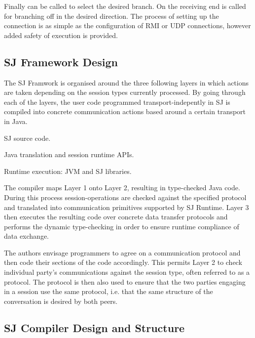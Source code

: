 Finally  can be called to select the desired branch. On the receiving end 
 is called for branching off in the desired direction. The process of setting up the connection is as simple as the configuration of RMI or UDP connections, however added safety of execution is provided.



\subsection{SJ Framework Design}
\label{subsec:sjdesign}

The SJ Framwork is organised around the three following layers in which actions are taken depending on the session types currently processed. By going through each of the layers, the user code programmed transport-indepently in SJ is compiled into concrete communication actions based around a certain transport in Java.

\begin{packed_description}
\item[Layer 1] SJ source code.
\item[Layer 2] Java translation and session runtime APIs.
\item[Layer 3] Runtime execution: JVM and SJ libraries.
\end{packed_description}

The compiler maps Layer 1 onto Layer 2, resulting in type-checked Java code. During this process session-operations are checked against the specified protocol and translated into communication primitives supported by SJ Runtime. Layer 3 then executes the resulting code over concrete data transfer protocols and performs the dynamic type-checking in order to ensure runtime compliance of data exchange.

The authors envisage programmers to agree on a communication protocol and then code their sections of the code accordingly. This permits Layer 2 to check individual party's communications against the session type, often referred to as a protocol. The protocol is then also used to ensure that the two parties engaging in a session use the same protocol, i.e. that the same structure of the conversation is desired by both peers.


\subsection{SJ Compiler Design and Structure}
\label{subsec:sjcomp} 

